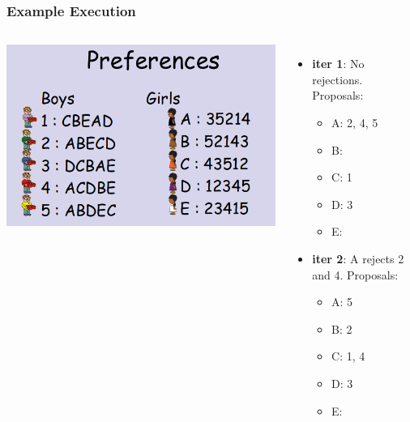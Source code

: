 \documentclass{beamer}
\begin{document}
\begin{frame}
  \frametitle{Example Execution}

  \begin{columns}
    \includegraphics[width=1\textwidth]{../img/marriage2}
    {\large
      \begin{itemize}
      \item {\bf iter 1}: No rejections. Proposals:
        \begin{itemize}
        \item A: 2, 4, 5
        \item B:
        \item C: 1
        \item D: 3
        \item E:
        \end{itemize}

      \item {\bf iter 2}: A rejects 2 and 4. Proposals:
        \begin{itemize}
        \item A: 5
        \item B: 2
        \item C: 1, 4
        \item D: 3
        \item E:
        \end{itemize}
      \end{itemize}

    }
  \end{columns}
\end{frame}
\end{document}
